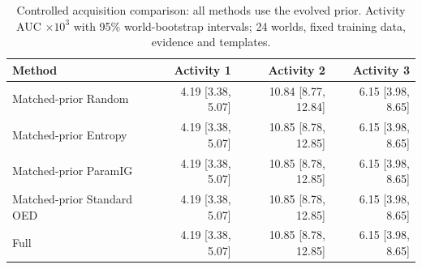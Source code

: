 \begin{table}[tbp]
\centering
\caption{Controlled acquisition comparison: all methods use the evolved prior. Activity AUC $\times10^3$ with 95\% world-bootstrap intervals; 24 worlds, fixed training data, evidence and templates.}
\label{tab:acquisition_matched}
\scriptsize
\setlength{\tabcolsep}{3pt}
\begin{tabular}{lrrr}
\toprule
Method & Activity 1 & Activity 2 & Activity 3 \\
\midrule
Matched-prior Random & 4.19 [3.38, 5.07] & 10.84 [8.77, 12.84] & 6.15 [3.98, 8.65] \\
Matched-prior Entropy & 4.19 [3.38, 5.07] & 10.85 [8.78, 12.85] & 6.15 [3.98, 8.65] \\
Matched-prior ParamIG & 4.19 [3.38, 5.07] & 10.85 [8.78, 12.85] & 6.15 [3.98, 8.65] \\
Matched-prior Standard OED & 4.19 [3.38, 5.07] & 10.85 [8.78, 12.85] & 6.15 [3.98, 8.65] \\
Full & 4.19 [3.38, 5.07] & 10.85 [8.78, 12.85] & 6.15 [3.98, 8.65] \\
\bottomrule
\end{tabular}
\end{table}

